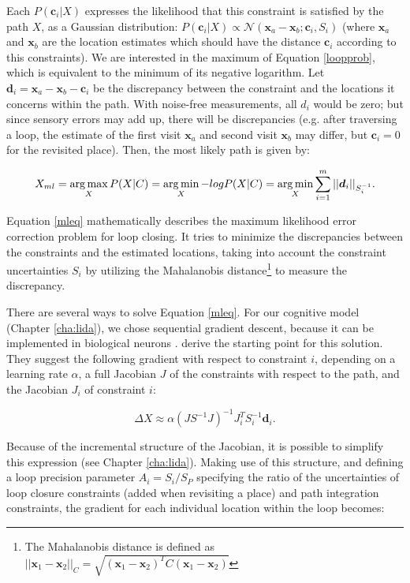 Each $P(\bm c_i|X)$ expresses the likelihood that this constraint is satisfied by the path $X$, as a Gaussian distribution: $P(\bm c_i|X)\propto\mathcal{N}(\bm x_a-\bm x_b;\bm c_i, S_i)$ (where $\bm x_a$ and $\bm x_b$ are the location estimates which should have the distance $\bm c_i$ according to this constraints). We are interested in the maximum of Equation \ref{loopprob}, which is equivalent to the minimum of its negative logarithm. Let $\bm d_i=\bm x_a - \bm x_b - \bm c_i$ be the discrepancy between the constraint and the locations it concerns within the path. With noise-free measurements, all $d_i$ would be zero; but since sensory errors may add up, there will be discrepancies (e.g. after traversing a loop, the estimate of the first visit $\bm x_a$ and second visit $\bm x_b$ may differ, but $\bm c_i=0$ for the revisited place). Then, the most likely path is given by:

\begin{equation}
\label{mleq}
X_{ml} = \operatorname*{arg\,max}_X P(X|C) = \operatorname*{arg\,min}_X -log P(X|C) = \operatorname*{arg\,min}_X \sum_{i=1}^{m} ||\bm d_i||_{S_i^{-1}}.
\end{equation}

Equation \ref{mleq} mathematically describes the maximum likelihood error correction problem for loop closing. It tries to minimize the discrepancies between the constraints and the estimated locations, taking into account the constraint uncertainties $S_i$ by utilizing the Mahalanobis distance\footnote{The Mahalanobis distance is defined as $||\bm x_1-\bm x_2||_C = \sqrt{(\bm x_1-\bm x_2)^TC(\bm x_1-\bm x_2)}$} to measure the discrepancy.

There are several ways to solve Equation \ref{mleq}. For our cognitive model (Chapter \ref{cha:lida}), we chose sequential gradient descent, because it can be implemented in biological neurons \citep{bengio2015towards}. \cite{olson2006fast} derive the starting point for this solution. They suggest the following gradient with respect to constraint $i$, depending on a learning rate $\alpha$, a full Jacobian $J$ of the constraints with respect to the path, and the Jacobian $J_i$ of constraint $i$:

\begin{equation}
\label{gradient}
\Delta X \approx \alpha (JS^{-1}J)^{-1}J_i^TS_i^{-1} \bm d_i.
\end{equation}

Because of the incremental structure of the Jacobian, it is possible to simplify this expression (see Chapter \ref{cha:lida}). Making use of this structure, and defining a loop precision parameter $A_i=S_i/S_P$ specifying the ratio of the uncertainties of loop closure constraints (added when revisiting a place) and path integration constraints, the gradient for each individual location within the loop becomes:

